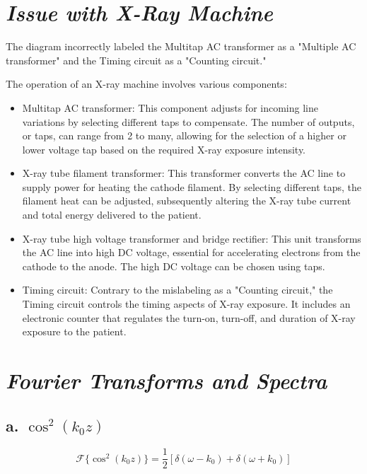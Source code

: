 \documentclass{article}
\begin{document}
\section{\textit{Issue with X-Ray Machine}}
The diagram incorrectly labeled the Multitap AC transformer as a "Multiple AC transformer" and the Timing circuit as a "Counting circuit."

The operation of an X-ray machine involves various components:
\begin{itemize}
\item Multitap AC transformer: This component adjusts for incoming line variations by selecting different taps to compensate. The number of outputs, or taps, can range from 2 to many, allowing for the selection of a higher or lower voltage tap based on the required X-ray exposure intensity.

\item X-ray tube filament transformer: This transformer converts the AC line to supply power for heating the cathode filament. By selecting different taps, the filament heat can be adjusted, subsequently altering the X-ray tube current and total energy delivered to the patient.

\item X-ray tube high voltage transformer and bridge rectifier: This unit transforms the AC line into high DC voltage, essential for accelerating electrons from the cathode to the anode. The high DC voltage can be chosen using taps.

\item Timing circuit: Contrary to the mislabeling as a "Counting circuit," the Timing circuit controls the timing aspects of X-ray exposure. It includes an electronic counter that regulates the turn-on, turn-off, and duration of X-ray exposure to the patient.
\end{itemize}
\newpage
\section{\textit{Fourier Transforms and Spectra}}

\subsection*{a. $ \cos^2(k_0 z) $}

\[
\mathcal{F}\{\cos^2(k_0 z)\} = \frac{1}{2} \left[ \delta(\omega - k_0) + \delta(\omega + k_0) \right]
\]

\begin{figure}[h]
  \centering
\end{figure}
\end{document}
